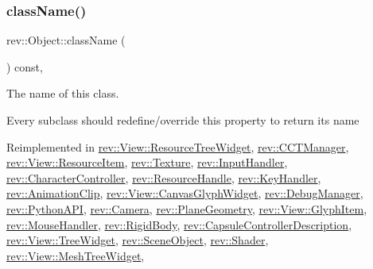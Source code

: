 \subsubsection{\texorpdfstring{className()}{className()}}
{\footnotesize\ttfamily rev\+::\+Object\+::class\+Name (\begin{DoxyParamCaption}{ }\end{DoxyParamCaption}) const\hspace{0.3cm}{\ttfamily [inline]}, {\ttfamily [virtual]}}



The name of this class. 

Every subclass should redefine/override this property to return its name 

Reimplemented in \mbox{\hyperlink{classrev_1_1_view_1_1_resource_tree_widget_ab15fda44cb0727f860a2d1071fefb104}{rev\+::\+View\+::\+Resource\+Tree\+Widget}}, \mbox{\hyperlink{classrev_1_1_c_c_t_manager_aef919c90f9877381d2f2c1ef24839741}{rev\+::\+C\+C\+T\+Manager}}, \mbox{\hyperlink{classrev_1_1_view_1_1_resource_item_ab53eb0848ac7e530ad5dc8220bf8609a}{rev\+::\+View\+::\+Resource\+Item}}, \mbox{\hyperlink{classrev_1_1_texture_a7f05304af91d3ea7ab923c43d9ad75d1}{rev\+::\+Texture}}, \mbox{\hyperlink{classrev_1_1_input_handler_a2837ab4ed7b6ce53f6aea9faa669021f}{rev\+::\+Input\+Handler}}, \mbox{\hyperlink{classrev_1_1_character_controller_a208a1325eb383cce3defc1badb5e53c4}{rev\+::\+Character\+Controller}}, \mbox{\hyperlink{classrev_1_1_resource_handle_a757714ddb5816e77198aceab2f4f0e1e}{rev\+::\+Resource\+Handle}}, \mbox{\hyperlink{classrev_1_1_key_handler_ae65760c99f0973da1d1290b35dfed051}{rev\+::\+Key\+Handler}}, \mbox{\hyperlink{classrev_1_1_animation_clip_a9bc0588a19cccdc1bc70ce7e58cb7ccd}{rev\+::\+Animation\+Clip}}, \mbox{\hyperlink{classrev_1_1_view_1_1_canvas_glyph_widget_a2c05ba4850db7c75a954a4dcda3f980f}{rev\+::\+View\+::\+Canvas\+Glyph\+Widget}}, \mbox{\hyperlink{classrev_1_1_debug_manager_a5962e13755e5a3b902f2d3f71e5948cb}{rev\+::\+Debug\+Manager}}, \mbox{\hyperlink{classrev_1_1_python_a_p_i_ab8d7ecd519d9d930bc7024a9e222218e}{rev\+::\+Python\+A\+PI}}, \mbox{\hyperlink{classrev_1_1_camera_afce9a32f0fcc9e0851d73aa37441c815}{rev\+::\+Camera}}, \mbox{\hyperlink{classrev_1_1_plane_geometry_a20bc1985065668b3e9716c8252d6b070}{rev\+::\+Plane\+Geometry}}, \mbox{\hyperlink{classrev_1_1_view_1_1_glyph_item_aeae051c75cc6ac7cccf256041721e840}{rev\+::\+View\+::\+Glyph\+Item}}, \mbox{\hyperlink{classrev_1_1_mouse_handler_ace8eaee7d8e16bfe3636c7d85615c075}{rev\+::\+Mouse\+Handler}}, \mbox{\hyperlink{classrev_1_1_rigid_body_a996230070162f743c3e87f5c20fd981e}{rev\+::\+Rigid\+Body}}, \mbox{\hyperlink{classrev_1_1_capsule_controller_description_aca7d4aff153f3db30084d730966ceb05}{rev\+::\+Capsule\+Controller\+Description}}, \mbox{\hyperlink{classrev_1_1_view_1_1_tree_widget_aedde04f44badced7c60f0e1570e3d0b2}{rev\+::\+View\+::\+Tree\+Widget}}, \mbox{\hyperlink{classrev_1_1_scene_object_a511357629f9d5957355f9a5cec239ec4}{rev\+::\+Scene\+Object}}, \mbox{\hyperlink{classrev_1_1_shader_a8f2c067bfde4f711b2851a070c23c231}{rev\+::\+Shader}}, \mbox{\hyperlink{classrev_1_1_view_1_1_mesh_tree_widget_a1fe0980bbddcafe4801991a0a70a8a3d}{rev\+::\+View\+::\+Mesh\+Tree\+Widget}}, 